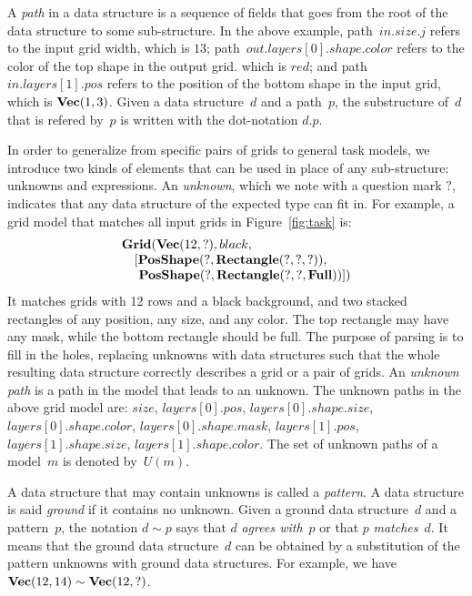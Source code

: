 \documentclass[a4paper]{llncs}
\begin{document}
A {\em path} in a data structure is a sequence of fields that goes
from the root of the data structure to some sub-structure. In the
above example, path~$in.size.j$ refers to the input grid width, which
is $13$; path~$out.layers[0].shape.color$ refers to the color of the top
shape in the output grid. which is $red$; and path~$in.layers[1].pos$
refers to the position of the bottom shape in the input grid, which is
${\bf Vec}(1,3)$. Given a data structure~$d$ and a path~$p$, the
substructure of~$d$ that is refered by~$p$ is written with the
dot-notation $d.p$.

In order to generalize from specific pairs of grids to general task
models, we introduce two kinds of elements that can be used in place
of any sub-structure: unknowns and expressions.
%
An {\em unknown}, which we note with a question mark $?$, indicates
that any data structure of the expected type can fit in. For example,
a grid model that matches all input grids in Figure~\ref{fig:task} is:
\[\begin{array}{l}
    {\bf Grid}({\bf Vec}(12,?), black,\\
    \quad [{\bf PosShape}(?, {\bf Rectangle}(?, ?, ?)),\\
    \quad ~{\bf PosShape}(?, {\bf Rectangle}(?, ?, {\bf Full}))])
  \end{array}\]
%
It matches grids with 12 rows and a black background, and two stacked
rectangles of any position, any size, and any color. The top rectangle
may have any mask, while the bottom rectangle should be full. The
purpose of parsing is to fill in the holes, replacing unknowns with
data structures such that the whole resulting data structure correctly
describes a grid or a pair of grids.
%
An {\em unknown path} is a path in the model that leads to an
unknown. The unknown paths in the above grid model are: $size$,
$layers[0].pos$, $layers[0].shape.size$, $layers[0].shape.color$,
$layers[0].shape.mask$, $layers[1].pos$, $layers[1].shape.size$,
$layers[1].shape.color$. The set of unknown paths of a model~$m$ is
denoted by~$U(m)$.

A data structure that may contain unknowns is called a {\em
  pattern}. A data structure is said {\em ground} if it contains no
unknown. Given a ground data structure~$d$ and a pattern~$p$, the
notation $d \sim p$ says that $d$ {\em agrees with}~$p$ or that $p$
{\em matches}~$d$. It means that the ground data structure~$d$ can be
obtained by a substitution of the pattern unknowns with ground data
structures. For example, we have
${\bf Vec}(12,14) \sim {\bf Vec}(12,?)$.
\end{document}

